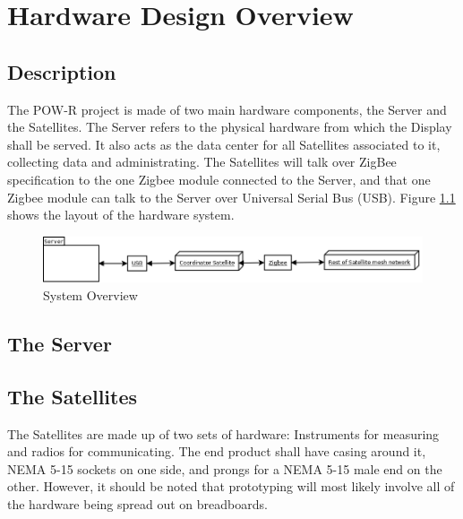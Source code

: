 
\chapter{Hardware Design Overview}

\section{Description}

The POW-R project is made of two main hardware components, the Server and the Satellites. The Server refers to the physical hardware from which the Display shall be served. It also acts as the data center for all Satellites associated to it, collecting data and administrating. The Satellites will talk over ZigBee specification to the one Zigbee module connected to the Server, and that one Zigbee module can talk to the Server over Universal Serial Bus (USB). Figure \ref{SystemOverview} shows the layout of the hardware system.


\begin{figure}[H]
\centering
\includegraphics[scale=0.3]{Hardware/images/SystemOverview.png}
\caption{System Overview}
\label{SystemOverview}
\end{figure}

\section{The Server}




\section{The Satellites}
The Satellites are made up of two sets of hardware: Instruments for measuring and radios for communicating. The end product shall have casing around it, NEMA 5-15 sockets on one side, and prongs for a NEMA 5-15 male end on the other. However, it should be noted that prototyping will most likely involve all of the hardware being spread out on breadboards.



